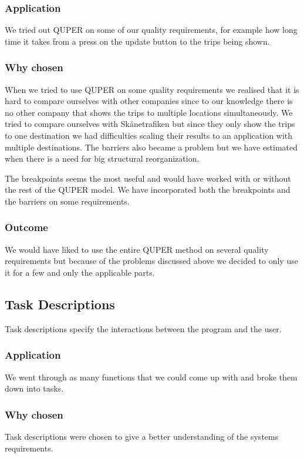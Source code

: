 \documentclass[a4paper]{article}
\begin{document}
			\subsubsection{Application}
			We tried out QUPER on some of our quality requirements, for example how long time it takes from a press on the update button to the trips being shown.
			\subsubsection{Why chosen}
			When we tried to use QUPER on some quality requirements we realised that it is hard to compare ourselves with other companies since to our knowledge there is no other company that shows the trips to multiple locations simultaneously. We tried to compare ourselves with Skånetrafiken but since they only show the trips to one destination we had difficulties scaling their results to an application with multiple destinations. The barriers also became a problem but we have estimated when there is a need for big structural reorganization. 
			
			The breakpoints seems the most useful and would have worked with or without the rest of the QUPER model. We have incorporated both the breakpoints and the barriers on some requirements.

			\subsubsection{Outcome}
			We would have liked to use the entire QUPER method on several quality requirements but because of the problems discussed above we decided to only use it for a few and only the applicable parts.		
		
		
		\subsection{Task Descriptions}
			Task descriptions specify the interactions between the program and the user.

			\subsubsection{Application}
				We went through as many functions that we could come up with and broke them down into tasks.
			\subsubsection{Why chosen}
				Task descriptions were chosen to give a better understanding of the systems requirements.
\end{document}
